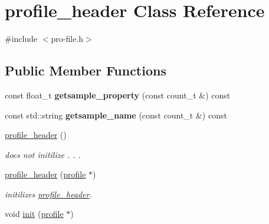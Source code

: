 \hypertarget{classprofile__header}{\section{profile\-\_\-header Class Reference}
\label{classprofile__header}
}


{\ttfamily \#include $<$pro-\/file.\-h$>$}

\subsection*{Public Member Functions}
\begin{DoxyCompactItemize}
\item 
\hypertarget{classprofile__header_aa666e5c8637ce8191b438d4cd0112cde}{const float\-\_\-t {\bfseries getsample\-\_\-property} (const count\-\_\-t \&) const }\label{classprofile__header_aa666e5c8637ce8191b438d4cd0112cde}

\item 
\hypertarget{classprofile__header_a201dbada841c37df4d9981826a4e9f9e}{const std\-::string {\bfseries getsample\-\_\-name} (const count\-\_\-t \&) const }\label{classprofile__header_a201dbada841c37df4d9981826a4e9f9e}

\item 
\hypertarget{classprofile__header_a6be558799b0b447f718c0546dd00033a}{\hyperlink{classprofile__header_a6be558799b0b447f718c0546dd00033a}{profile\-\_\-header} ()}\label{classprofile__header_a6be558799b0b447f718c0546dd00033a}

\begin{DoxyCompactList}\small\item\em does not initilize . . . \end{DoxyCompactList}\item 
\hypertarget{classprofile__header_aa4fb665d7db7ecb1ac44a14d6a387cc3}{\hyperlink{classprofile__header_aa4fb665d7db7ecb1ac44a14d6a387cc3}{profile\-\_\-header} (\hyperlink{classprofile}{profile} $\ast$)}\label{classprofile__header_aa4fb665d7db7ecb1ac44a14d6a387cc3}

\begin{DoxyCompactList}\small\item\em initilizes \hyperlink{classprofile__header}{profile\-\_\-header}. \end{DoxyCompactList}\item 
\hypertarget{classprofile__header_a378de68d739e5a923f53dca9431ee597}{void \hyperlink{classprofile__header_a378de68d739e5a923f53dca9431ee597}{init} (\hyperlink{classprofile}{profile} $\ast$)}\label{classprofile__header_a378de68d739e5a923f53dca9431ee597}


\end{DoxyCompactItemize}
